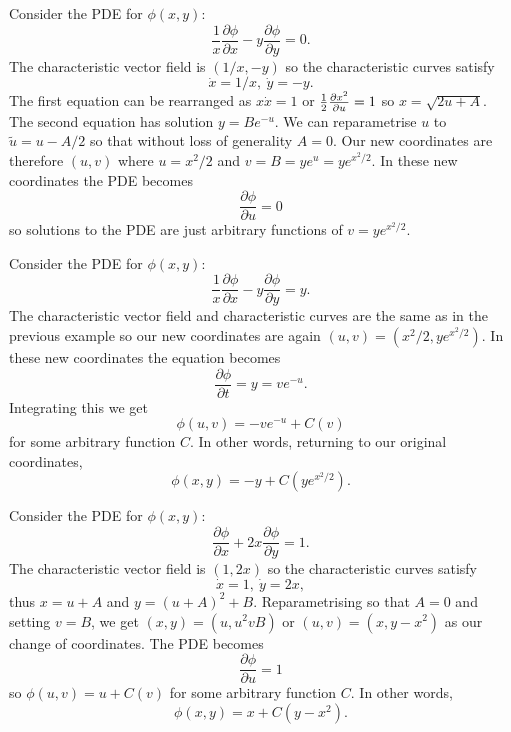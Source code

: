 \begin{exm}
Consider the PDE for $\phi(x,y)$:
\[\frac{1}{x}\frac{\partial\phi}{\partial x}-y\frac{\partial\phi}{\partial y}=0.\]
The characteristic vector field is $(1/x,-y)$ so the characteristic curves satisfy
\[\dot{x}=1/x,\ \dot{y}=-y.\]
The first equation can be rearranged as $x\dot{x}=1$ or $\frac{1}{2}\frac{\partial x^2}{\partial u}=1$ so $x=\sqrt{2u+A}$. The second equation has solution $y=Be^{-u}$. We can reparametrise $u$ to $\tilde{u}=u-A/2$ so that without loss of generality $A=0$. Our new coordinates are therefore $(u,v)$ where $u=x^2/2$ and $v=B=ye^u=ye^{x^2/2}$. In these new coordinates the PDE becomes
\[\frac{\partial\phi}{\partial u}=0\]
so solutions to the PDE are just arbitrary functions of $v=ye^{x^2/2}$.
\end{exm}
\begin{exm}
Consider the PDE for $\phi(x,y)$:
\[\frac{1}{x}\frac{\partial\phi}{\partial x}-y\frac{\partial\phi}{\partial y}=y.\]
The characteristic vector field and characteristic curves are the same as in the previous example so our new coordinates are again $(u,v)=(x^2/2,ye^{x^2/2})$. In these new coordinates the equation becomes
\[\frac{\partial\phi}{\partial t}=y=ve^{-u}.\]
Integrating this we get
\[\phi(u,v)=-ve^{-u}+C(v)\]
for some arbitrary function $C$. In other words, returning to our original coordinates,
\[\phi(x,y)=-y+C(ye^{x^2/2}).\]
\end{exm}
\begin{exm}
Consider the PDE for $\phi(x,y)$:
\[\frac{\partial\phi}{\partial x}+2x\frac{\partial\phi}{\partial y}=1.\]
The characteristic vector field is $(1,2x)$ so the characteristic curves satisfy
\[\dot{x}=1,\ \dot{y}=2x,\]
thus $x=u+A$ and $y=(u+A)^2+B$. Reparametrising so that $A=0$ and setting $v=B$, we get $(x,y)=(u,u^2vB)$ or $(u,v)=(x,y-x^2)$ as our change of coordinates. The PDE becomes
\[\frac{\partial\phi}{\partial u}=1\]
so $\phi(u,v)=u+C(v)$ for some arbitrary function $C$. In other words,
\[\phi(x,y)=x+C(y-x^2).\]
\end{exm}
